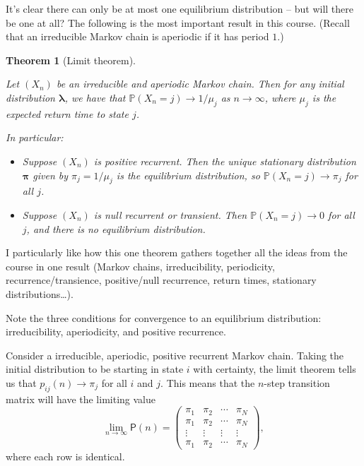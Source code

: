 \documentclass[
  a4paper,
]{article}
\providecommand{\tightlist}{%
  \setlength{\itemsep}{0pt}\setlength{\parskip}{0pt}}
\newtheorem{theorem}{Theorem}[section]
\theoremstyle{definition}
\theoremstyle{definition}
\theoremstyle{definition}
\theoremstyle{remark}
\begin{document}
It's clear there can only be at most one equilibrium distribution -- but will there be one at all? The following is the most important result in this course. (Recall that an irreducible Markov chain is aperiodic if it has period \(1\).)

\begin{theorem}[Limit theorem]
\protect\hypertarget{thm:limit}{}\label{thm:limit}

Let \((X_n)\) be an irreducible and aperiodic Markov chain. Then for any initial distribution \(\boldsymbol\lambda\), we have that \(\mathbb P(X_n = j) \to 1/\mu_j\) as \(n \to \infty\), where \(\mu_j\) is the expected return time to state \(j\).

In particular:

\begin{itemize}
\tightlist
\item
  Suppose \((X_n)\) is positive recurrent. Then the unique stationary distribution \(\boldsymbol\pi\) given by \(\pi_j = 1/\mu_j\) is the equilibrium distribution, so \(\mathbb P(X_n = j) \to \pi_j\) for all \(j\).
\item
  Suppose \((X_n)\) is null recurrent or transient. Then \(\mathbb P(X_n = j) \to 0\) for all \(j\), and there is no equilibrium distribution.
\end{itemize}

\end{theorem}

I particularly like how this one theorem gathers together all the ideas from the course in one result (Markov chains, irreducibility, periodicity, recurrence/transience, positive/null recurrence, return times, stationary distributions\ldots).

Note the three conditions for convergence to an equilibrium distribution: irreducibility, aperiodicity, and positive recurrence.

Consider a irreducible, aperiodic, positive recurrent Markov chain. Taking the initial distribution to be starting in state \(i\) with certainty, the limit theorem tells us that \(p_{ij}(n) \to \pi_j\) for all \(i\) and \(j\). This means that the \(n\)-step transition matrix will have the limiting value
\[ \lim_{n \to \infty} \mathsf P(n) = \begin{pmatrix}
     \pi_1 & \pi_2 & \cdots & \pi_N \\
     \pi_1 & \pi_2 & \cdots & \pi_N \\
     \vdots & \vdots & \vdots & \vdots \\
     \pi_1 & \pi_2 & \cdots & \pi_N \end{pmatrix} , \]
where each row is identical.
\end{document}

